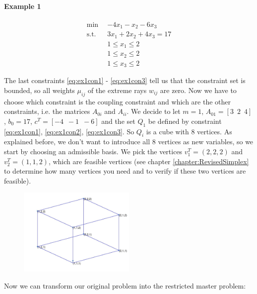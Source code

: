 \documentclass[a4paper,12pt]{article}
\begin{document}
\paragraph*{Example 1}

\begin{align}
\min \enspace &  -4x_1 - x_2 - 6x_3  \label{eq:ex1objective}\\
\text{s.t.} \enspace & 3x_1 + 2x_2 + 4x_3 = 17 \label{eq:ex1couplecon} \\
& 1 \leq x_1  \leq 2 \label{eq:ex1con1}\\ 
& 1 \leq x_2  \leq 2 \label{eq:ex1con2}\\
& 1 \leq x_3  \leq 2 \label{eq:ex1con3}
\end{align}

The last constraints \eqref{eq:ex1con1} - \eqref{eq:ex1con3} tell us that the constraint set is bounded, so all weights $\mu_{ij}$ of the extreme rays $w_{ij}$ are zero. Now we have to choose which constraint is the coupling constraint and which are the other constraints, i.e. the matrices $A_{0i}$ and $A_{ii}$. We decide to let $m = 1$, $A_{01} = [3 \enspace 2 \enspace 4]$, $b_0 = 17$, $c^T = [-4 \enspace -1 \enspace -6]$ and the set $Q_1$ be defined by constraint \eqref{eq:ex1con1}, \eqref{eq:ex1con2}, \eqref{eq:ex1con3}. So $Q_i$ is a cube with 8 vertices. As explained before, we don't want to introduce all 8 vertices as new variables, so we start by choosing an admissible basis. We pick the vertices $v_1^T = (2,2,2)$ and $v_2^T = (1,1,2)$, which are feasible vertices (see chapter \ref{chapter:RevisedSimplex} to determine how many vertices you need and to verify if these two vertices are feasible).

\begin{figure}[htbp] 
  \centering
     \includegraphics[width=0.5\textwidth]{cube.jpg}
\end{figure}


 Now we can transform our original problem into the restricted master problem:
\end{document}
